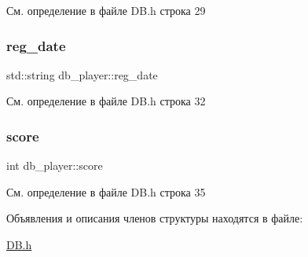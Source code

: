 См. определение в файле D\+B.\+h строка 29

\mbox{\label{structdb__player_abef0de717f781b401effd7d3c35550c2}} 
\subsubsection{\texorpdfstring{reg\_date}{reg\_date}}
{\footnotesize\ttfamily std\+::string db\+\_\+player\+::reg\+\_\+date}



См. определение в файле D\+B.\+h строка 32

\mbox{\label{structdb__player_a49a7074936df50c10ce3573663e902bc}} 
\subsubsection{\texorpdfstring{score}{score}}
{\footnotesize\ttfamily int db\+\_\+player\+::score}



См. определение в файле D\+B.\+h строка 35



Объявления и описания членов структуры находятся в файле\+:\begin{DoxyCompactItemize}
\item 
\mbox{\hyperlink{_d_b_8h}{D\+B.\+h}}\end{DoxyCompactItemize}
